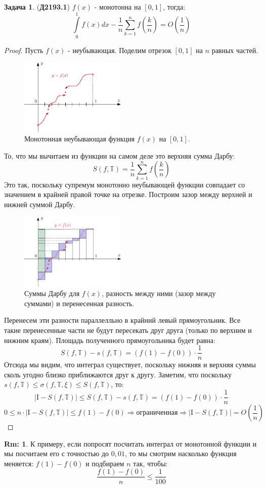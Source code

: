 \documentclass[12pt]{article}
\newcommand{\MTB}{\mathbb{T}}
\newcommand{\MI}{\mathrm{I}}
\theoremstyle{definition}
\newtheorem{rem}{Rm:}
\newtheorem{problem}{Задача}
\newcommand{\ddsum}[2]{\displaystyle\sum\limits_{#1}^{#2}}
\newcommand{\ddint}[2]{\displaystyle\int\limits_{#1}^{#2}}
\begin{document}
\begin{problem}(\textbf{Д2193.1})
	$f(x)$ - монотонна на $[0,1]$, тогда:
	$$
		\ddint{0}{1}f(x)dx - \dfrac{1}{n}\ddsum{k = 1}{n}f\left(\dfrac{k}{n}\right) = O\left(\dfrac{1}{n}\right)
	$$
\end{problem}
\begin{proof}
	Пусть $f(x)$ - неубывающая. Поделим отрезок $[0,1]$ на $n$ равных частей.
	\begin{figure}[H]
		\centering
		\includegraphics[width=0.45\textwidth]{MA2S8_5.eps}
		\caption{Монотонная неубывающая функция $f(x)$ на $[0,1]$.}
		\label{8_5}
	\end{figure}
	То, что мы вычитаем из функции на самом деле это верхняя сумма Дарбу:
	$$
		S(f,\MTB) = \dfrac{1}{n}\ddsum{k = 1}{n}f\left(\dfrac{k}{n}\right)
	$$
	Это так, поскольку супремум монотонно неубывающей функции совпадает со значением в крайней правой точке на отрезке. Построим зазор между верхней и нижней суммой Дарбу.
	\begin{figure}[H]
		\centering
		\includegraphics[width=0.45\textwidth]{MA2S8_6.png}
		\caption{Суммы Дарбу для $f(x)$, разность между ними (зазор между суммами) и перенесенная разность.}
		\label{8_6}
	\end{figure}
	Перенесем эти разности параллелльно в крайний левый прямоугольник. Все такие перенесенные части не будут пересекать друг друга (только по верхним и нижним краям). Площадь полученного прямоугольника будет равна:
	$$
		S(f,\MTB) - s(f,\MTB) = (f(1) - f(0)){\cdot}\dfrac{1}{n}
	$$
	Отсюда мы видим, что интеграл существует, поскольку нижняя и верхняя суммы сколь угодно близко приближаются друг к другу. Заметим, что поскольку $s(f,\MTB) \leq \sigma(f,\MTB,\xi) \leq S(f,\MTB)$, то:
	$$
		|\MI - S(f,\MTB)| \leq S(f,\MTB) - s(f,\MTB) = (f(1) - f(0)){\cdot}\dfrac{1}{n}
	$$
	$$
		0\leq n{\cdot}|\MI - S(f,\MTB)|\leq f(1) - f(0) \Rightarrow \text{ограниченная} \Rightarrow |\MI - S(f,\MTB)| = O\left(\dfrac{1}{n}\right)
	$$
\end{proof}
\begin{rem}
	К примеру, если попросят посчитать интеграл от монотонной функции и мы посчитаем его с точностью до $0,01$, то мы смотрим насколько функция меняется: $f(1) - f(0)$ и подбираем $n$ так, чтобы:
	$$
		\dfrac{f(1) - f(0)}{n} \leq \dfrac{1}{100}
	$$
\end{rem}
\end{document}

